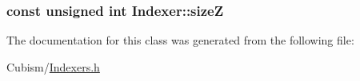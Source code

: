 \subsubsection[{size\+Z}]{\setlength{\rightskip}{0pt plus 5cm}const unsigned int Indexer\+::size\+Z\hspace{0.3cm}{\ttfamily [protected]}}\label{class_indexer_a054ea5515e47670dd528c1520c2fa698}


The documentation for this class was generated from the following file\+:\begin{DoxyCompactItemize}
\item 
Cubism/\hyperlink{_indexers_8h}{Indexers.\+h}\end{DoxyCompactItemize}
